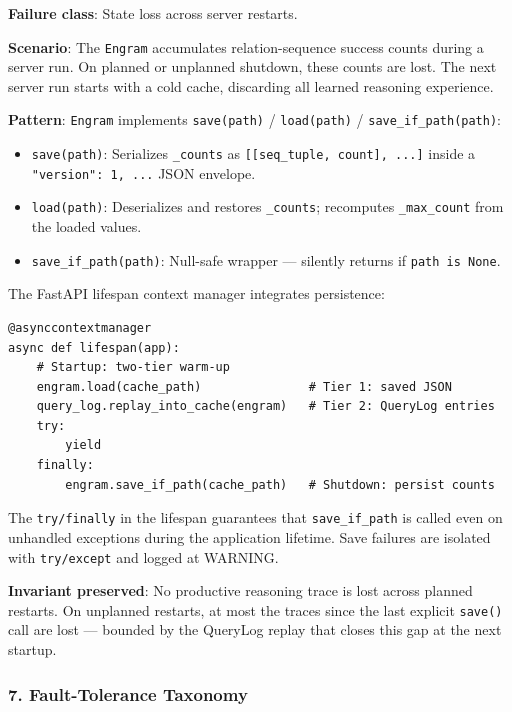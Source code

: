 \textbf{Failure class}: State loss across server restarts.

\textbf{Scenario}: The \texttt{Engram} accumulates relation-sequence success counts during a server run. On planned or unplanned shutdown, these counts are lost. The next server run starts with a cold cache, discarding all learned reasoning experience.

\textbf{Pattern}: \texttt{Engram} implements \texttt{save(path)} / \texttt{load(path)} / \texttt{save\_if\_path(path)}:

\begin{itemize}
\item \texttt{save(path)}: Serializes \texttt{\_counts} as \texttt{[[seq\_tuple, count], ...]} inside a \texttt{{"version": 1, ...}} JSON envelope.
\item \texttt{load(path)}: Deseri\-alizes and restores \texttt{\_counts}; recomputes \texttt{\_max\_count} from the loaded values.
\item \texttt{save\_if\_path(path)}: Null-safe wrapper — silently returns if \texttt{path is None}.

\end{itemize}
The FastAPI lifespan context manager integrates persistence:

\begin{lstlisting}
@asynccontextmanager
async def lifespan(app):
    # Startup: two-tier warm-up
    engram.load(cache_path)               # Tier 1: saved JSON
    query_log.replay_into_cache(engram)   # Tier 2: QueryLog entries
    try:
        yield
    finally:
        engram.save_if_path(cache_path)   # Shutdown: persist counts
\end{lstlisting}

The \texttt{try/finally} in the lifespan guarantees that \texttt{save\_if\_path} is called even on unhandled exceptions during the application lifetime. Save failures are isolated with \texttt{try/except} and logged at WARNING.

\textbf{Invariant preserved}: No productive reasoning trace is lost across planned restarts. On unplanned restarts, at most the traces since the last explicit \texttt{save()} call are lost — bounded by the QueryLog replay that closes this gap at the next startup.

\subsubsection{7. Fault-Tolerance Taxonomy}

